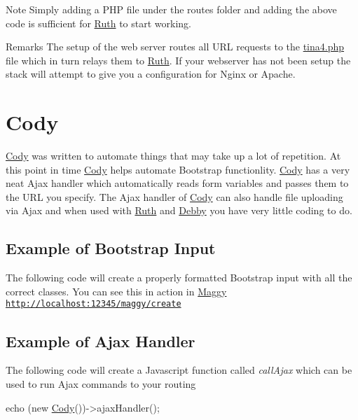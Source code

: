 \begin{DoxyNote}{Note}
Simply adding a P\+H\+P file under the routes folder and adding the above code is sufficient for \hyperlink{classRuth}{Ruth} to start working.
\end{DoxyNote}
\begin{DoxyRemark}{Remarks}
The setup of the web server routes all U\+R\+L requests to the \hyperlink{tina4_8php}{tina4.\+php} file which in turn relays them to \hyperlink{classRuth}{Ruth}. If your webserver has not been setup the stack will attempt to give you a configuration for Nginx or Apache.
\end{DoxyRemark}
\hypertarget{index_cody}{}\section{Cody}\label{index_cody}
\hyperlink{classCody}{Cody} was written to automate things that may take up a lot of repetition. At this point in time \hyperlink{classCody}{Cody} helps automate Bootstrap functionlity. \hyperlink{classCody}{Cody} has a very neat Ajax handler which automatically reads form variables and passes them to the U\+R\+L you specify. The Ajax handler of \hyperlink{classCody}{Cody} can also handle file uploading via Ajax and when used with \hyperlink{classRuth}{Ruth} and \hyperlink{classDebby}{Debby} you have very little coding to do.\hypertarget{index_cody_example}{}\subsection{Example of Bootstrap Input}\label{index_cody_example}
The following code will create a properly formatted Bootstrap input with all the correct classes. You can see this in action in \hyperlink{classMaggy}{Maggy} \href{http://localhost:12345/maggy/create}{\tt http\+://localhost\+:12345/maggy/create} 
\hypertarget{index_code_example_ajax}{}\subsection{Example of Ajax Handler}\label{index_code_example_ajax}
The following code will create a Javascript function called {\itshape call\+Ajax} which can be used to run Ajax commands to your routing 
\begin{DoxyCode}
echo (\textcolor{keyword}{new} \hyperlink{classCody}{Cody}())->ajaxHandler();
\end{DoxyCode}
 